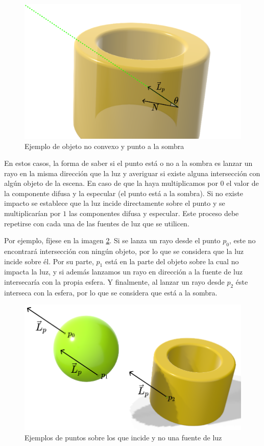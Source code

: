 \begin{figure} [ht]
    \centering
    \includegraphics[scale = 0.25]{img/C8/no-convexo.png}
    \caption{Ejemplo de objeto no convexo y punto a la sombra}
    \label{fig:no-convexo}
\end{figure}

En estos casos, la forma de saber si el punto está o no a la sombra es lanzar un rayo en la misma dirección que la luz y averiguar si existe alguna intersección con algún objeto de la escena. En caso de que la haya multiplicamos por $0$ el valor de la componente difusa y la especular (el punto está a la sombra). Si no existe impacto se establece que la luz incide directamente sobre el punto y se multiplicarían por $1$ las componentes difusa y especular. Este proceso debe repetirse con cada una de las fuentes de luz que se utilicen.

Por ejemplo, fíjese en la imagen \ref{fig:sombras}. Si se lanza un rayo desde el punto $p_0$, este no encontrará intersección con ningún objeto, por lo que se considera que la luz incide sobre él. Por su parte, $p_1$ está en la parte del objeto sobre la cual no impacta la luz, y si además lanzamos un rayo en dirección a la fuente de luz intersecaría con la propia esfera. Y finalmente, al lanzar un rayo desde $p_2$ éste interseca con la esfera, por lo que se considera que está a la sombra.

\begin{figure} [ht]
    \centering
    \includegraphics[scale = 0.3]{img/C8/sombras.png}
    \caption{Ejemplos de puntos sobre los que incide y no una fuente de luz}
    \label{fig:sombras}
\end{figure}

